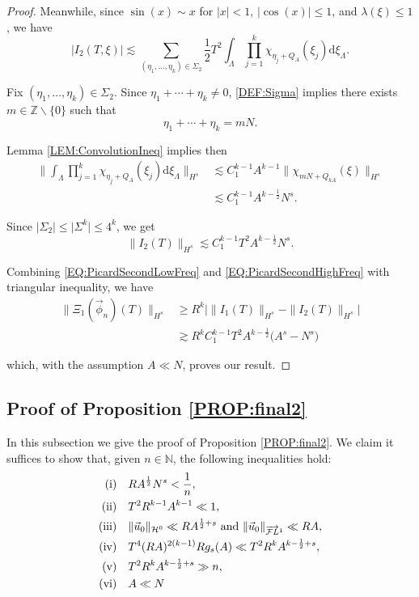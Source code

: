 \documentclass[letterpaper, 11pt,  reqno]{amsart}
\newcommand{\1}{\hspace{0.5mm}\text{I}\hspace{0.5mm}}
\newcommand{\noi}{\noindent}
\newcommand{\Z}{\mathbb{Z}}
\newcommand{\NB}{\mathbb{N}}
\newcommand{\FLv}{\overrightarrow{\mathcal{F}L}}
\renewcommand{\H}{\mathcal{H}}
\newcommand{\ld}{\lambda}
\newcommand{\Ld}{\Lambda}
\newcommand{\Si}{\Sigma}
\newcommand{\les}{\lesssim}
\newcommand{\ges}{\gtrsim}
\numberwithin{equation}{section}
\numberwithin{theorem}{section}
\newcommand{\abs}[1]{\lvert#1\rvert}
\begin{document}
\begin{proof}
Meanwhile, since $\sin(x) \sim x$ for $\abs{x} < 1$, $\abs{ \cos(x)}\leq 1$, and $\ld(\xi) \leq 1$, we have 
$$
\abs{I_2 (T, \xi)}  \les \sum\limits_{(\eta_1, \dots, \eta_k) \in \Si_2} \frac 12 T^2 \int_\Ld \prod^k_{j=1} \chi_{\eta_j + Q_A}(\xi_j) \mathrm{d}\xi_\Ld.
$$

\noi Fix $(\eta_1 , \dots, \eta_k) \in \Si_2$. Since $\eta_1 + \cdots + \eta_k \neq 0$, \eqref{DEF:Sigma} implies there exists $m \in \Z \backslash \{ 0 \}$ such that 
$$
\eta_1 + \cdots + \eta_k = m N.
$$

\noi Lemma \ref{LEM:ConvolutionIneq} implies then
\begin{align*}
\bigg\| \int_\Ld \prod^k_{j=1} \chi_{\eta_j + Q_A}(\xi_j) \mathrm{d}\xi_\Ld \bigg\|_{H^s} & \les C^{k-1}_1 A^{k-1} \| \chi_{ mN + Q_{kA}} (\xi)\|_{H^s} \\
	& \les C^{k-1}_1 A^{k-\frac 12} N^s.
\end{align*}

\noi Since $\abs{\Si_2} \leq \abs{\Si^k} \leq 4^k$, we get
\begin{equation}
\label{EQ:PicardSecondHighFreq}
\| I_2 (T) \|_{H^s}  \les C^{k-1}_1 T^2 A^{k - \frac 12} N^s .
\end{equation}

\noi Combining \eqref{EQ:PicardSecondLowFreq} and \eqref{EQ:PicardSecondHighFreq} with triangular inequality, we have
\begin{align*}
\| \Xi_1 (\vec{\phi}_n) (T) \|_{ H^s} & \geq R^k \big| \| I_1(T) \|_{H^s} - \| I_2 (T) \|_{H^s} \big| \\
	& \ges R^k C^{k-1}_1 T^2 A^{k - \frac 12} \big(  A^{s} -  N^s \big)
\end{align*}

\noi which, with the assumption $A \ll N$, proves our result.

\end{proof}

\subsection{Proof of Proposition \ref{PROP:final2}}

In this subsection we give the proof of Proposition \ref{PROP:final2}. We claim it suffices to show that, given $n \in \NB$, the following inequalities hold:
\begin{align*}
\textup{(i)} & \quad RA^{\frac 12} N^s < \frac 1n, \\
\textup{(ii)} & \quad T^2 R^{k-1} A^{k-1} \ll 1, \\
\textup{(iii)} & \quad \| \vec{u}_0 \|_{\H^0} \ll R A^{\frac 12 + s} \text{ and } \| \vec{u}_0\|_{\FLv^1} \ll RA, \\
\textup{(iv)} & \quad T^4  (RA)^{2(k-1)} R g_s (A) \ll T^2 R^k A^{k - \frac 12 + s}, \\
\textup{(v)} & \quad T^2 R^k A^{k - \frac 12 + s} \gg n, \\
\textup{(vi)} & \quad A \ll N
\end{align*}
\end{document}
